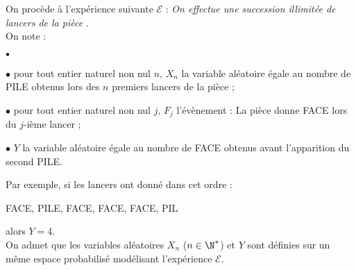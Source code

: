 \documentclass[11pt]{article}%
\begin{document}
\noindent On procède à l'expérience suivante $\mathcal{E}$ : \og
\textit{On effectue une succession illimitée de lancers de la pièce}
\fg.\\

\noindent On note :
\begin{noliste}{$\scriptstyle \bullet$}
\item[$\bullet$] pour tout entier naturel non nul $n$, $X_{n}$ la
variable aléatoire égale au nombre de PILE obtenus lors des $n$
premiers lancers de la pièce ;
\item[$\bullet$] pour tout entier naturel non nul $j$, $F_{j}$
l'évènement : \og La pièce donne FACE lors du $j$-ième lancer \fg ;
\item[$\bullet$] $Y$ la variable aléatoire égale au nombre de FACE
obtenus avant l'apparition du second PILE.\\
\end{noliste}

\noindent Par exemple, si les lancers ont donné dans cet ordre : 
\begin{center} \og FACE, PILE, FACE, FACE, FACE, PIL\E\fg \end{center}
alors $Y = 4$.\\

\noindent On admet que les variables aléatoires $X_{n}$ ($n\in \N^*$)
et $Y$ sont définies sur un même espace probabilisé modélisant
l'expérience $\mathcal{E}$.\\
\end{document}

